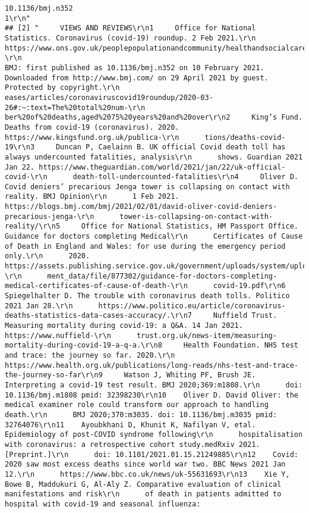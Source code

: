 \documentclass[
]{book}
\begin{document}
\begin{verbatim}
10.1136/bmj.n352                                                                                                                          1\r\n"
## [2] "     VIEWS AND REVIEWS\r\n1     Office for National Statistics. Coronavirus (covid-19) roundup. 2 Feb 2021.\r\n      https://www.ons.gov.uk/peoplepopulationandcommunity/healthandsocialcare/conditionsanddis-\r\n                                                                                                                                                                 BMJ: first published as 10.1136/bmj.n352 on 10 February 2021. Downloaded from http://www.bmj.com/ on 29 April 2021 by guest. Protected by copyright.\r\n      eases/articles/coronaviruscovid19roundup/2020-03-26#:~:text=The%20total%20num-\r\n      ber%20of%20deaths,aged%2075%20years%20and%20over\r\n2     King’s Fund. Deaths from covid-19 (coronavirus). 2020. https://www.kingsfund.org.uk/publica-\r\n      tions/deaths-covid-19\r\n3     Duncan P, Caelainn B. UK official Covid death toll has always undercounted fatalities, analysis\r\n      shows. Guardian 2021 Jan 22. https://www.theguardian.com/world/2021/jan/22/uk-official-covid-\r\n      death-toll-undercounted-fatalities\r\n4     Oliver D. Covid deniers’ precarious Jenga tower is collapsing on contact with reality. BMJ Opinion\r\n      1 Feb 2021. https://blogs.bmj.com/bmj/2021/02/01/david-oliver-covid-deniers-precarious-jenga-\r\n      tower-is-collapsing-on-contact-with-reality/\r\n5     Office for National Statistics, HM Passport Office. Guidance for doctors completing Medical\r\n      Certificates of Cause of Death in England and Wales: for use during the emergency period only.\r\n      2020. https://assets.publishing.service.gov.uk/government/uploads/system/uploads/attach-\r\n      ment_data/file/877302/guidance-for-doctors-completing-medical-certificates-of-cause-of-death-\r\n      covid-19.pdf\r\n6     Spiegelhalter D. The trouble with coronavirus death tolls. Politico 2021 Jan 28.\r\n      https://www.politico.eu/article/coronavirus-deaths-statistics-data-cases-accuracy/.\r\n7     Nuffield Trust. Measuring mortality during covid-19: a Q&A. 14 Jan 2021. https://www.nuffield-\r\n      trust.org.uk/news-item/measuring-mortality-during-covid-19-a-q-a.\r\n8     Health Foundation. NHS test and trace: the journey so far. 2020.\r\n      https://www.health.org.uk/publications/long-reads/nhs-test-and-trace-the-journey-so-far\r\n9     Watson J, Whiting PF, Brush JE. Interpreting a covid-19 test result. BMJ 2020;369:m1808.\r\n      doi: 10.1136/bmj.m1808 pmid: 32398230\r\n10    Oliver D. David Oliver: the medical examiner role could transform our approach to handling death.\r\n      BMJ 2020;370:m3035. doi: 10.1136/bmj.m3035 pmid: 32764076\r\n11    Ayoubkhani D, Khunit K, Nafilyan V, etal. Epidemiology of post-COVID syndrome following\r\n      hospitalisation with coronavirus: a retrospective cohort study.medRxiv 2021. [Preprint.]\r\n      doi: 10.1101/2021.01.15.21249885\r\n12    Covid: 2020 saw most excess deaths since world war two. BBC News 2021 Jan 12.\r\n      https://www.bbc.co.uk/news/uk-55631693\r\n13    Xie Y, Bowe B, Maddukuri G, Al-Aly Z. Comparative evaluation of clinical manifestations and risk\r\n      of death in patients admitted to hospital with covid-19 and seasonal influenza: 
\end{verbatim}
\end{document}
